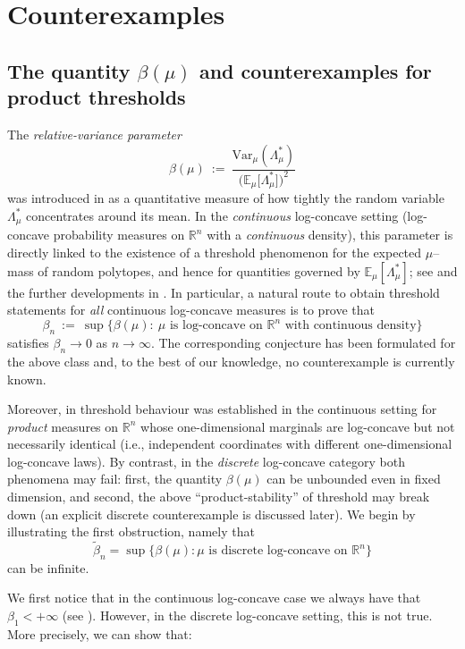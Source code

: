 \documentclass[11pt,a4paper]{article} %
\theoremstyle{definition}
\theoremstyle{remark}
\newcommand{\R}{\mathbb{R}}
\newcommand{\E}{\mathbb{E}}
\newcommand{\1}{\mathds{1}}
\begin{document}
\section{Counterexamples}


\subsection{The quantity $\beta(\mu)$ and counterexamples for product thresholds}
The \emph{relative-variance parameter}
\[
\beta(\mu)\ :=\ \frac{\mathrm{Var}_{\mu}(\Lambda^{\ast}_\mu)}{\big(\E_{\mu}[\Lambda^{\ast}_\mu\big])^2}
\]
was introduced in \cite{BGP} as a quantitative measure of how tightly the random variable
$\Lambda^{\ast}_\mu$ concentrates around its mean. In the \emph{continuous} log-concave setting (log-concave
probability measures on $\R^n$ with a \emph{continuous} density), this parameter is directly linked to the existence
of a threshold phenomenon for the expected $\mu$--mass of random polytopes, and hence for quantities
governed by $\E_\mu[\Lambda^{\ast}_\mu]$; see \cite{BGP} and the further developments in
\cite{BC}. In particular, a natural route to obtain threshold statements for \emph{all} continuous
log-concave measures is to prove that
\[
\beta_n\ :=\ \sup\{\beta(\mu):\ \mu \text{ is log-concave on }\R^n \text{ with continuous density}\}
\]
satisfies $\beta_n\to 0$ as $n\to\infty$. The corresponding conjecture has been formulated for the above class
and, to the best of our knowledge, no counterexample is currently known.

\medskip

Moreover, in \cite{BC} threshold behaviour was established in the continuous setting for \emph{product} measures on $\R^n$
whose one-dimensional marginals are log-concave but not necessarily identical (i.e., independent coordinates with
different one-dimensional log-concave laws). By contrast, in the \emph{discrete} log-concave category both phenomena
may fail: first, the quantity $\beta(\mu)$ can be unbounded even in fixed dimension, and second, the above
``product-stability'' of threshold may break down (an explicit discrete counterexample is discussed later).
We begin by illustrating the first obstruction, namely that $$\tilde\beta_n=\sup\{ \beta(\mu): \mu \text{ is discrete log-concave on } \mathbb{R}^n\} $$ can be infinite.
\medskip



We first notice that in the continuous log-concave case we always have that $\beta_1 < +\infty$ (see \cite{BC}). However, in the discrete log-concave setting, this is not true. More precisely, we can show that:
\end{document}

